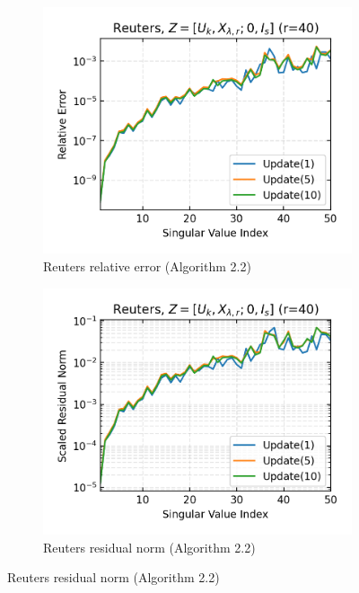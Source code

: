 \begin{figure}
\begin{subfigure}[b]{0.48\textwidth}
  \end{subfigure}
    \begin{subfigure}[b]{0.48\textwidth}
    \centering
    \includegraphics[width=\textwidth]{figures/reuters/Reuters_bcg_n_batches_10_k_dims_50_rval_40_rel_err.png}
    \caption{Reuters relative error (Algorithm 2.2)}
  \end{subfigure}
  \hfill
  \begin{subfigure}[b]{0.48\textwidth}
    \centering
    \includegraphics[width=\textwidth]{figures/reuters/Reuters_bcg_n_batches_10_k_dims_50_rval_40_res_norm.png}
    \caption{Reuters residual norm (Algorithm 2.2)}

\end{subfigure}
\end{figure}
